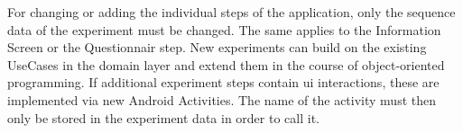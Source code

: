 For changing or adding the individual steps of the application, only the sequence data of the experiment must be changed. The same applies to the Information Screen or the Questionnair step. New experiments can build on the existing UseCases in the domain layer and extend them in the course of object-oriented programming. If additional experiment steps contain \ac{ui} interactions, these are implemented via new Android Activities. The name of the activity must then only be stored in the experiment data in order to call it.